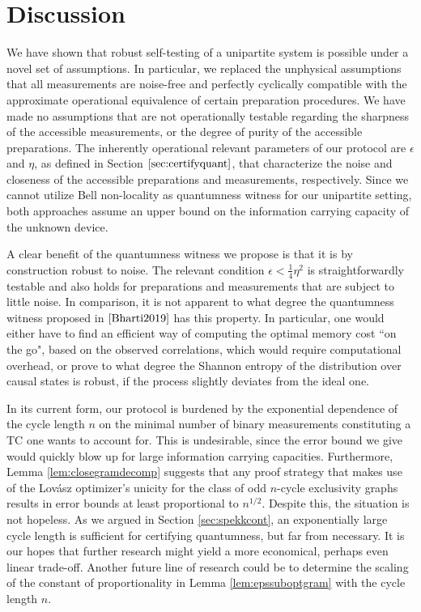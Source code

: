 \section{Discussion}
\label{sec:discussion}
We have shown that robust self-testing of a unipartite system is possible under a novel set of assumptions. In particular, we replaced the unphysical assumptions that all measurements are noise-free and perfectly cyclically compatible with the approximate operational equivalence of certain preparation procedures. We have made no assumptions that are not operationally testable regarding the sharpness of the accessible measurements, or the degree of purity of the accessible preparations. The inherently operational relevant parameters of our protocol are $\epsilon$ and $\eta$, as defined in Section $\ref{sec:certifyquant}$, that characterize the noise and closeness of the accessible preparations and measurements, respectively.
Since we cannot utilize Bell non-locality as quantumness witness for our unipartite setting, both approaches assume an upper bound on the information carrying capacity of the unknown device.

A clear benefit of the quantumness witness we propose is that it is by construction robust to noise. The relevant condition $\epsilon<\frac{1}{4}\eta^2$ is straightforwardly testable and also holds for preparations and measurements that are subject to little noise. In comparison, it is not apparent to what degree the quantumness witness proposed in $\cite{Bharti2019}$ has this property. In particular, one would either have to find an efficient way of computing the optimal memory cost ``on the go", based on the observed correlations, which would require computational overhead, or prove to what degree the Shannon entropy of the distribution over causal states is robust, if the process slightly deviates from the ideal one.

In its current form, our protocol is burdened by the exponential dependence of the cycle length $n$ on the minimal number of binary measurements constituting a TC one wants to account for. This is undesirable, since the error bound we give would quickly blow up for large information carrying capacities. Furthermore, Lemma \ref{lem:closegramdecomp} suggests that any proof strategy that makes use of the Lovász optimizer's unicity for the class of odd $n$-cycle exclusivity graphs results in error bounds at least proportional to $n^{1/2}$. Despite this, the situation is not hopeless. As we argued in Section \ref{sec:spekkcont}, an exponentially large cycle length is sufficient for certifying quantumness, but far from necessary. It is our hopes that further research might yield a more economical, perhaps even linear trade-off. Another future line of research could be to determine the scaling of the constant of proportionality in Lemma \ref{lem:epssuboptgram} with the cycle length $n$.

